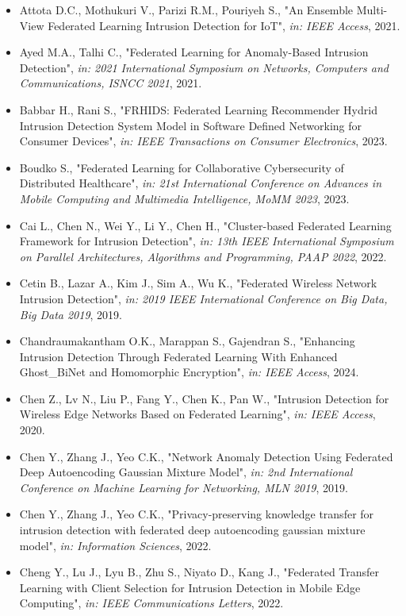 \begin{itemize}
  \item Attota D.C., Mothukuri V., Parizi R.M., Pouriyeh S., "An Ensemble Multi-View Federated Learning Intrusion Detection for IoT", \textit{in: IEEE Access}, 2021.
  \item Ayed M.A., Talhi C., "Federated Learning for Anomaly-Based Intrusion Detection", \textit{in: 2021 International Symposium on Networks, Computers and Communications, ISNCC 2021}, 2021.
  \item Babbar H., Rani S., "FRHIDS: Federated Learning Recommender Hydrid Intrusion Detection System Model in Software Defined Networking for Consumer Devices", \textit{in: IEEE Transactions on Consumer Electronics}, 2023.
  \item Boudko S., "Federated Learning for Collaborative Cybersecurity of Distributed Healthcare", \textit{in: 21st International Conference on Advances in Mobile Computing and Multimedia Intelligence, MoMM 2023}, 2023.
  \item Cai L., Chen N., Wei Y., Li Y., Chen H., "Cluster-based Federated Learning Framework for Intrusion Detection", \textit{in: 13th IEEE International Symposium on Parallel Architectures, Algorithms and Programming, PAAP 2022}, 2022.
  \item Cetin B., Lazar A., Kim J., Sim A., Wu K., "Federated Wireless Network Intrusion Detection", \textit{in: 2019 IEEE International Conference on Big Data, Big Data 2019}, 2019.
  \item Chandraumakantham O.K., Marappan S., Gajendran S., "Enhancing Intrusion Detection Through Federated Learning With Enhanced Ghost\_BiNet and Homomorphic Encryption", \textit{in: IEEE Access}, 2024.
  \item Chen Z., Lv N., Liu P., Fang Y., Chen K., Pan W., "Intrusion Detection for Wireless Edge Networks Based on Federated Learning", \textit{in: IEEE Access}, 2020.
  \item Chen Y., Zhang J., Yeo C.K., "Network Anomaly Detection Using Federated Deep Autoencoding Gaussian Mixture Model", \textit{in: 2nd International Conference on Machine Learning for Networking, MLN 2019}, 2019.
  \item Chen Y., Zhang J., Yeo C.K., "Privacy-preserving knowledge transfer for intrusion detection with federated deep autoencoding gaussian mixture model", \textit{in: Information Sciences}, 2022.
  \item Cheng Y., Lu J., Lyu B., Zhu S., Niyato D., Kang J., "Federated Transfer Learning with Client Selection for Intrusion Detection in Mobile Edge Computing", \textit{in: IEEE Communications Letters}, 2022.

\end{itemize}
